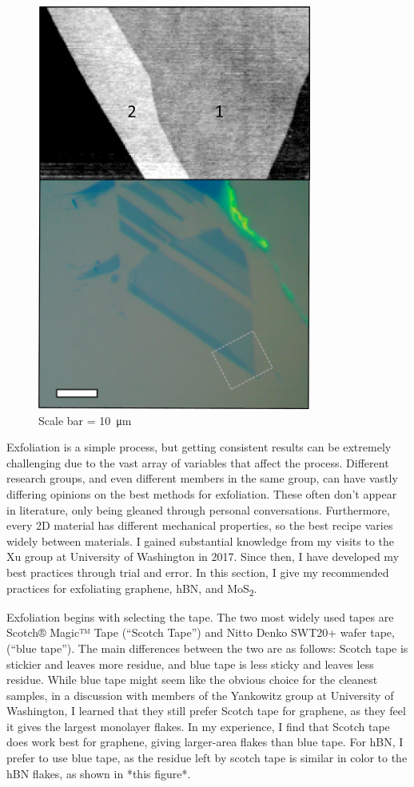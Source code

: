 \documentclass[double,12pt,1in]{beavtex}
\begin{document}
\begin{figure}[ht!]
    \centering
    \includegraphics[width = 9cm]{graphene layer comparison.png}
    \caption{Scale bar = \SI{10}{\micro\meter}}
    \label{fig:graphenelayer}
    
\end{figure}

Exfoliation is a simple process, but getting consistent results can be extremely challenging due to the vast array of variables that affect the process. Different research groups, and even different members in the same group, can have vastly differing opinions on the best methods for exfoliation. These often don’t appear in literature, only being gleaned through personal conversations. Furthermore, every 2D material has different mechanical properties, so the best recipe varies widely between materials. I gained substantial knowledge from my visits to the Xu group at University of Washington in 2017. Since then, I have developed my best practices through trial and error. In this section, I give my recommended practices for exfoliating graphene, hBN, and MoS\textsubscript{2}.

Exfoliation begins with selecting the tape. The two most widely used tapes are Scotch® Magic™ Tape (“Scotch Tape”) and Nitto Denko SWT20+ wafer tape, (“blue tape”). The main differences between the two are as follows: Scotch tape is stickier and leaves more residue, and blue tape is less sticky and leaves less residue. While blue tape might seem like the obvious choice for the cleanest samples, in a discussion with members of the Yankowitz group at University of Washington, I learned that they still prefer Scotch tape for graphene, as they feel it gives the largest monolayer flakes. In my experience, I find that Scotch tape does work best for graphene, giving larger-area flakes than blue tape. For hBN, I prefer to use blue tape, as the residue left by scotch tape is similar in color to the hBN flakes, as shown in *this figure*.
\end{document}
